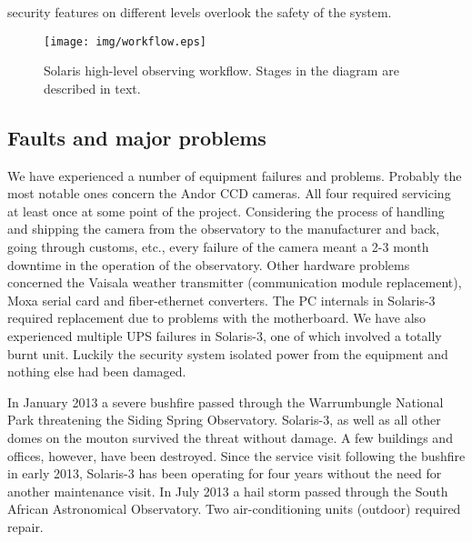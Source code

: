 security features on different levels overlook the safety of the system.

\begin{figure}[htb!]
\centering
\texttt{[image: img/workflow.eps]}
\caption{Solaris high-level observing workflow. Stages in the diagram are described in text.}
\label{fig:Workflow}
\end{figure}


\subsection{Faults and major problems}
\label{sec:Faults}
We have experienced a number of equipment failures and problems. Probably the most notable ones concern the Andor CCD cameras. All four required servicing at least once at some point of the project. Considering the process of handling and shipping the camera from the observatory to the manufacturer and back, going through customs, etc., every failure of the camera meant a 2-3 month downtime in the operation of the observatory. Other hardware problems concerned the Vaisala weather transmitter (communication module replacement), Moxa serial card and fiber-ethernet converters. The PC internals in Solaris-3 required replacement due to problems with the motherboard. We have also experienced multiple UPS failures in Solaris-3, one of which involved a totally burnt unit. Luckily the security system isolated power from the equipment and nothing else had been damaged.

In January 2013 a severe bushfire passed through the Warrumbungle National Park threatening the Siding Spring Observatory. Solaris-3, as well as all other domes on the mouton survived the threat without damage. A few buildings and offices, however, have been destroyed. Since the service visit following the bushfire in early 2013, Solaris-3 has been operating for four years without the need for another maintenance visit.
In July 2013 a hail storm passed through the South African Astronomical Observatory. Two air-conditioning units (outdoor) required repair. 
%


